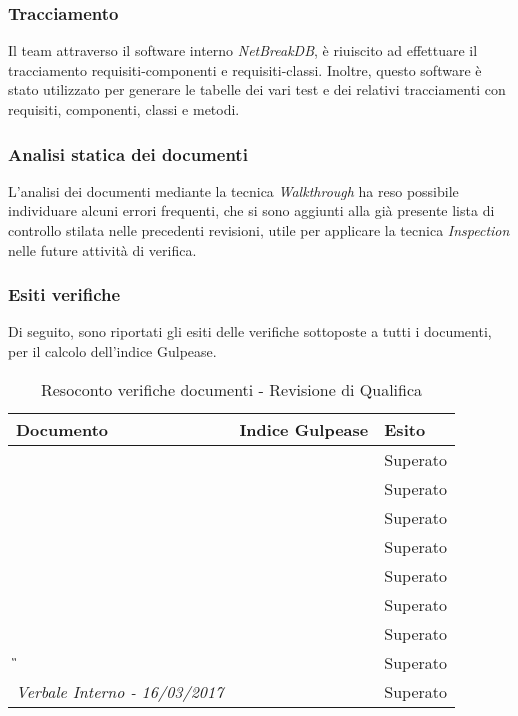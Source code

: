 \subsubsection{Tracciamento}
Il team attraverso il software interno \textit{NetBreakDB}, è riuiscito ad effettuare il tracciamento requisiti-componenti e requisiti-classi. Inoltre, questo software è stato utilizzato per generare le tabelle dei vari test e dei relativi tracciamenti con requisiti, componenti, classi e metodi.

\subsubsection{Analisi statica dei documenti}
L’analisi dei documenti mediante la tecnica \textit{Walkthrough} ha reso possibile individuare alcuni errori frequenti, che si sono aggiunti alla già presente lista di controllo stilata nelle precedenti revisioni, utile per applicare la tecnica \textit{Inspection} nelle future attività di verifica.

\subsubsection{Esiti verifiche}
Di seguito, sono riportati gli esiti delle verifiche sottoposte a tutti i documenti, per il calcolo dell’indice Gulpease.

\begin{table}[H]
	\begin{longtable}{>{\centering\arraybackslash}p{5cm}|>{\centering\arraybackslash}p{5cm} | >{\centering\arraybackslash}p{5cm}}
		\hline
		\rowcolor{Gray}
		\textbf{Documento} & \textbf{Indice Gulpease} & \textbf{Esito} \\
		\hline
		\textit{\DDP} &   & Superato\\
		\hline
		\textit{\MU} &   & Superato\\
		\hline
		\textit{\ST} &   & Superato\\
		\hline
		\textit{\NdP} &   & Superato\\
		\hline
		\textit{\PdP} &  & Superato \\
		\hline
		\textit{\PdQ} &   & Superato\\
		\hline
		\textit{\AdR} &   & Superato \\
		\hline
		\textit{\G}&  & Superato\\
		\hline
		\textit{Verbale Interno - 16/03/2017}		& 		&	Superato	\\
		\hline
	\end{longtable}
	\caption{Resoconto verifiche documenti - Revisione di Qualifica}
\end{table}
